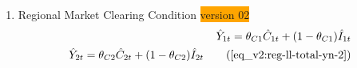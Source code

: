 \documentclass[../thesis.tex]{subfiles}
\begin{document}
{\begin{enumerate}
		\item Regional Market Clearing Condition \colorbox{orange}{version 02}
		\begin{align}
			\hat{Y}_{1t} = \theta_{C1} \hat{C}_{1t} + (1 - \theta_{C1}) \hat{I}_{1t} \nonumber \\
			\hat{Y}_{2t} = \theta_{C2} \hat{C}_{2t} + (1 - \theta_{C2}) \hat{I}_{2t} \tag{\ref{eq_v2:reg-ll-total-yn-2}}
		\end{align}
		
	\end{enumerate}
	
} %

\begin{comment}

\hrule

\subsubsection{Equations without $\eta$}

\begin{enumerate}
	
	\item Monetary Policy
	\begin{align}
		& \hat{R}_t = \gamma_R \hat{R}_{t-1} + (1-\gamma_R)(\gamma_\pi \hat{\pi}_t + \gamma_Y \hat{Y}_t) + \hat{Z}_{Mt}
	\end{align}
	
	\item National Gross Inflation Rate
	\begin{align}
		\hat{\pi}_{t} &= \hat{P}_{t} - \hat{P}_{t-1}
	\end{align}
	
	\item National Price Level
	\begin{alignat}{2}
		\hat{P}_{t} + \hat{Y}_{t} &= \theta_{PY1} (\hat{P}_{1t} + \hat{Y}_{1t}) + (1-\theta_{PY1}) (\hat{P}_{2t} + \hat{Y}_{2t})
	\end{alignat}
	
	\item Monetary Shock
	\begin{alignat}{2}
		\hat{Z}_{Mt} &= \rho_M \hat{Z}_{M,t-1} + \varepsilon_{M}
	\end{alignat}
	
	\item Market Clearing Condition
	\begin{align}
		\hat{Y}_{t} &= \theta_{Y1} \hat{Y}_{1t} + (1-\theta_{Y1}) \hat{Y}_{2t}
	\end{align}
	

\end{comment}
\end{document}
